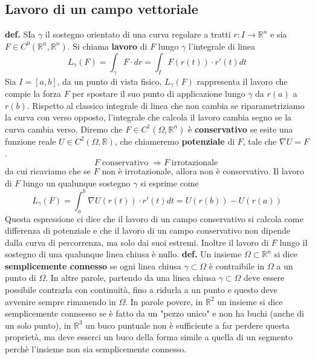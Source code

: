 \subsection{Lavoro di un campo vettoriale}
\textbf{def.} SIa $\gamma$ il sostegno orientato di una curva regolare a tratti $r: I \rightarrow \mathbb{R}^n$ e sia $F \in C ^0(\mathbb{R}^n, \mathbb{R}^n)$. Si chiama \textbf{lavoro} di $F$ lungo $\gamma$ l'integrale di linea
\[
    L_\gamma (F) = \int_{\gamma} F \cdot dr = \int_{I} F(r(t))\cdot r'(t) dt
\]
Sia $I = [a,b]$, da un punto di vista fisico, $L_\gamma(F)$ rappresenta il lavoro che compie la forza $F$ per spostare il suo punto di applicazione lungo $\gamma$ da $r(a)$ a $r(b)$.\newline
Rispetto al classico integrale di linea che non cambia se riparametriziamo la curva con verso opposto, l'integrale che calcola il lavoro cambia segno se la curva cambia verso.\newline
\newline
Diremo che $F \in C^1(\Omega, \mathbb{R}^n)$ è \textbf{conservativo} se esite una funzione reale $U \in C^2(\Omega, \mathbb{R})$, che chiameremo \textbf{potenziale} di $F$, tale che $\nabla U = F$.\newline
\newline
\[
    F \; \text{conservativo}\; \Longrightarrow F \; \text{irrotazionale}\;
\]
da cui ricaviamo che se $F$ non è irrotazionale, allora non è conservativo.\newline
\newline
Il lavoro di $F$ lungo un qualunque sostegno $\gamma$ si esprime come
\[
    L_\gamma(F) = \int_{a}^{b}\nabla U(r(t)) \cdot r'(t) dt = U(r(b)) - U(r(a))
\]
Questa espressione ci dice che il lavoro di un campo conservativo si calcola come differenza di potenziale e che il lavoro di un campo conservativo non dipende dalla curva di percorrenza, ma solo dai suoi estremi. Inoltre il lavoro di $F$ lungo il sostegno di una qualunque linea chiusa è nullo.\newline
\newline
\textbf{def.} Un insieme $\Omega \subset \mathbb{R}^n$ si dice \textbf{semplicemente connesso} se ogni linea chiusa $\gamma \subset \Omega$ è contraibile in $\Omega$ a un punto di $\Omega$. In altre parole, partendo da una linea chiusa $\gamma \subset \Omega$ deve essere possibile contrarla con continuità, fino a ridurla a un punto e questo deve avvenire sempre rimanendo in $\Omega$.\newline
In parole povere, in $\mathbb{R}^2$ un insieme si dice semplicemente connsesso se è fatto da un "pezzo unico" e non ha buchi (anche di un solo punto), in $\mathbb{R}^3$ un buco puntuale non è sufficiente a far perdere questa proprietà, ma deve esserci un buco della forma simile a quella di un segmento perchè l'insieme non sia semplicemente connesso.\newline
